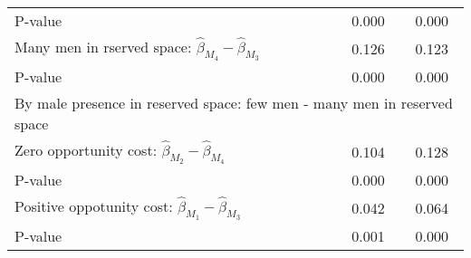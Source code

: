 \begin{tabular}{l*{2}{c}}
\quad P-value       &       0.000         &       0.000         \\
\quad Many men in rserved space: $\hat\beta_{M_4} - \hat\beta_{M_3}$ &       0.126         &       0.123         \\
\quad P-value       &       0.000         &       0.000         \\
\multicolumn{3}{l}{By male presence in reserved space: few men - many men in reserved space} \\ \quad Zero opportunity cost: $\hat\beta_{M_2} - \hat\beta_{M_4}$&       0.104         &       0.128         \\
\quad P-value       &       0.000         &       0.000         \\
\quad Positive oppotunity cost: $\hat\beta_{M_1} - \hat\beta_{M_3}$ &       0.042         &       0.064         \\
\quad P-value       &       0.001         &       0.000         \\
\hline\hline \end{tabular}
